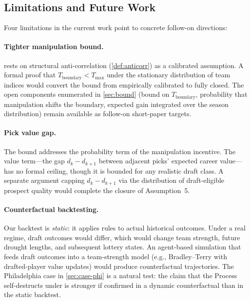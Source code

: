 \subsection{Limitations and Future Work}
\label{sec:limitations}

Four limitations in the current work point to concrete follow-on directions:

\paragraph{Tighter manipulation bound.}  rests on structural anti-correlation (\cref{def:anticorr}) as a calibrated assumption. A formal proof that $T_{\text{boundary}} < T_{\max}$ under the stationary distribution of team indices would convert the bound from empirically calibrated to fully closed. The open components enumerated in \cref{sec:bound} (bound on $T_{\text{boundary}}$, probability that manipulation shifts the boundary, expected gain integrated over the season distribution) remain available as follow-on short-paper targets.

\paragraph{Pick value gap.} The bound addresses the probability term of the manipulation incentive. The value term---the gap $d_k - d_{k+1}$ between adjacent picks' expected career value---has no formal ceiling, though it is bounded for any realistic draft class. A separate argument capping $d_k - d_{k+1}$ via the distribution of draft-eligible prospect quality would complete the closure of Assumption~5.

\paragraph{Counterfactual backtesting.} Our backtest is \emph{static}: it applies \cola{} rules to actual historical outcomes. Under a real \cola{} regime, draft outcomes would differ, which would change team strength, future drought lengths, and subsequent lottery states. An agent-based simulation that feeds \cola{} draft outcomes into a team-strength model (e.g., Bradley--Terry with drafted-player value updates) would produce counterfactual trajectories. The Philadelphia case in \cref{sec:case-phi} is a natural test: the claim that the Process self-destructs under \cola{} is stronger if confirmed in a dynamic counterfactual than in the static backtest.

